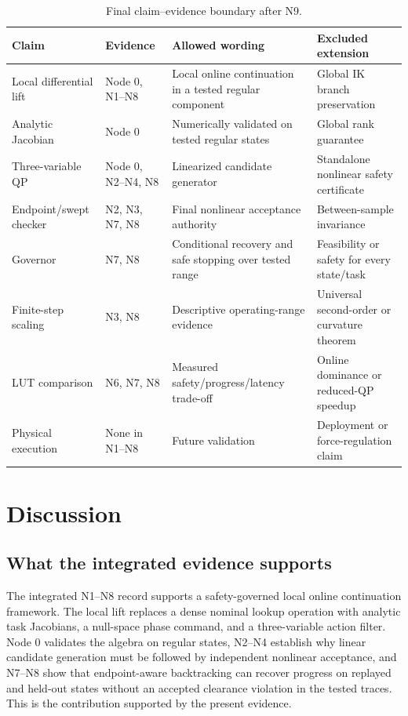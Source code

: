 \documentclass[preprint,12pt]{elsarticle}
\begin{document}
\begin{table}[t]
\centering
\scriptsize
\caption{Final claim--evidence boundary after N9.}
\label{tab:claim_boundary}
\begin{tabularx}{\textwidth}{@{}p{}p{}p{}X@{}}
\toprule
Claim & Evidence & Allowed wording & Excluded extension \\
\midrule
Local differential lift & Node 0, N1--N8 & Local online continuation in a tested regular component & Global IK branch preservation \\
Analytic Jacobian & Node 0 & Numerically validated on tested regular states & Global rank guarantee \\
Three-variable QP & Node 0, N2--N4, N8 & Linearized candidate generator & Standalone nonlinear safety certificate \\
Endpoint/swept checker & N2, N3, N7, N8 & Final nonlinear acceptance authority & Between-sample invariance \\
Governor & N7, N8 & Conditional recovery and safe stopping over tested range & Feasibility or safety for every state/task \\
Finite-step scaling & N3, N8 & Descriptive operating-range evidence & Universal second-order or curvature theorem \\
LUT comparison & N6, N7, N8 & Measured safety/progress/latency trade-off & Online dominance or reduced-QP speedup \\
Physical execution & None in N1--N8 & Future validation & Deployment or force-regulation claim \\
\bottomrule
\end{tabularx}
\end{table}


\section{Discussion}
\label{sec:discussion}

\subsection{What the integrated evidence supports}

The integrated N1--N8 record supports a safety-governed local online continuation framework. The local lift replaces a dense nominal lookup operation with analytic task Jacobians, a null-space phase command, and a three-variable action filter. Node 0 validates the algebra on regular states, N2--N4 establish why linear candidate generation must be followed by independent nonlinear acceptance, and N7--N8 show that endpoint-aware backtracking can recover progress on replayed and held-out states without an accepted clearance violation in the tested traces. This is the contribution supported by the present evidence.
\end{document}
